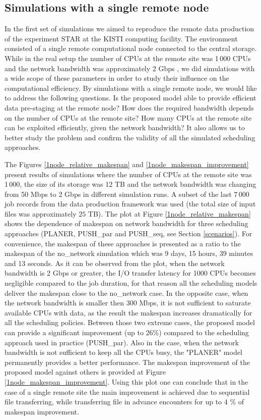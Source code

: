 \documentclass{svjour3}                     %
\begin{document}
\subsection{Simulations with a single remote node}
In the first set of simulations we aimed to reproduce the remote data production of the experiment STAR at the KISTI computing facility. The environment consisted of a single remote computational node connected to the central storage. While in the real setup the number of CPUs at the remote site was 1\,000 CPUs and the network bandwidth was approximately 2 Gbps \cite{KISTI-production}, we did simulations with a wide scope of these parameters in order to study their influence on the computational efficiency. By simulations with a single remote node, we would like to address the following questions. Is the proposed model able to provide efficient data pre-staging at the remote node? How does the required bandwidth depends on the number of CPUs at the remote site? How many CPUs at the remote site can be exploited efficiently, given the network bandwidth? It also allows us to better study the problem and confirm the validity of all the simulated scheduling approaches.


The Figures \ref{1node_relative_makespan} and \ref{1node_makespan_improvement} present results of simulations where the number of CPUs at the remote site was 1\,000, the size of its storage was 12 TB and the network bandwidth was changing from 50 Mbps to 2 Gbps in different simulation runs. A subset of the last 7\,000 job records from the data production framework was used (the total size of input files was approximately $25$ TB). The plot at Figure \ref{1node_relative_makespan} shows the dependence of makespan on network bandwidth for three scheduling approaches (PLANER, PUSH\_par and PUSH\_seq, see Section \ref{scenarios}). For convenience, the makespan of these approaches is presented as a ratio to the makespan of the no\_network simulation which was 9 days, 15 hours, 39 minutes and 13 seconds. As it can be observed from the plot, when the network bandwidth is 2 Gbps or greater, the I/O transfer latency for 1000 CPUs becomes negligible compared to the job duration, for that reason all the scheduling models deliver the makespan close to the no\_network case. In the opposite case, when the network bandwidth is smaller then 300 Mbps, it is not sufficient to saturate available CPUs with data, as the result the makespan increases dramatically for all the scheduling policies. Between those two extreme cases, the proposed model can provide a significant improvement (up to 26\%) compared to the scheduling approach used in practice (PUSH\_par). Also in the case, when the network bandwidth is not sufficient to keep all the CPUs busy, the "PLANER" model permanently provides a better performance. The makespan improvement of the proposed model against others is provided at Figure \ref{1node_makespan_improvement}. Using this plot one can conclude that in the case of a single remote site the main improvement is achieved due to sequential file transferring, while transferring file in advance encounters for up to 4 \% of makespan improvement.
\end{document}
